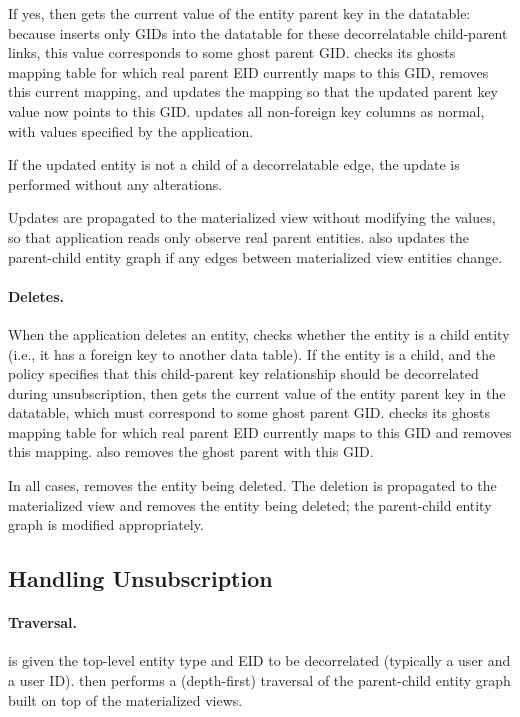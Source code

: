 If yes, then \sys{} gets the current value of the entity parent key in the datatable: because \sys{}
inserts only GIDs into the datatable for these decorrelatable child-parent links, this value 
corresponds to some ghost parent GID.
\sys{} checks its ghosts mapping table for which real parent EID currently maps to this GID, removes
this current mapping, and updates the mapping so that the updated parent key value now points to
this GID.
\sys{} updates all non-foreign key columns as normal, with values specified by the application.

If the updated entity is not a child of a decorrelatable edge, the update is performed without any
alterations.

Updates are propagated to the materialized view without modifying the values, so that application
reads only observe real parent entities.
\sys{} also updates the parent-child entity graph if any edges between materialized view entities change.

\paragraph{Deletes.}
When the application deletes an entity, \sys{} checks whether
the entity is a child entity (i.e., it has a foreign key to another data table). 
If the entity is a child, and the policy specifies that this child-parent key
relationship should be decorrelated during unsubscription, then \sys{} gets the current value of the
entity parent key in the datatable, which must correspond to some ghost parent GID.
\sys{} checks its ghosts mapping table for which real parent EID currently maps to this GID and removes
this mapping. \sys{} also removes the ghost parent with this GID.

In all cases, \sys{} removes the entity being deleted.
The deletion is propagated to the materialized view and removes the entity being deleted; the
parent-child entity graph is modified appropriately.

\subsection{Handling Unsubscription}
\paragraph{Traversal.}
\sys{} is given the top-level entity type and EID to be decorrelated (typically a user and a user ID).
\sys{} then performs a (depth-first) traversal of the parent-child entity graph built on top of the materialized
views. 

